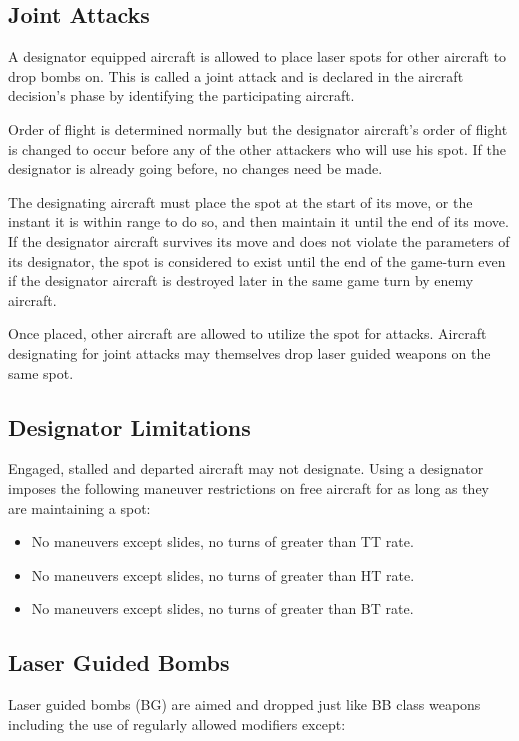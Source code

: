 
\subsection{Joint Attacks} A designator equipped aircraft is allowed to place laser spots for other aircraft to drop bombs on. This is called a joint attack and is declared in the aircraft decision's phase by identifying the participating aircraft.

Order of flight is determined normally but the designator aircraft's order of flight is changed to occur before any of the other attackers who will use his spot. If the designator is already going before, no changes need be made.

The designating aircraft must place the spot at the start of its move, or the instant it is within range to do so, and then maintain it until the end of its move. If the designator aircraft survives its move and does not violate the parameters of its designator, the spot is considered to exist until the end of the game-turn even if the designator aircraft is destroyed later in the same game turn by enemy aircraft.

Once placed, other aircraft are allowed to utilize the spot for attacks. Aircraft designating for joint attacks may themselves drop laser guided weapons on the same spot.

\subsection{Designator Limitations} Engaged, stalled and departed aircraft may not designate. Using a designator imposes the following maneuver restrictions on free aircraft for as long as they are maintaining a spot:

\begin{itemize}
\item{} No maneuvers except slides, no turns of greater than TT rate.

\item{} No maneuvers except slides, no turns of greater than HT rate.

\item{} No maneuvers except slides, no turns of greater than BT rate.
\end{itemize}

\subsection{Laser Guided Bombs} Laser guided bombs (BG) are aimed and dropped just like BB class weapons including the use of regularly allowed modifiers except:

